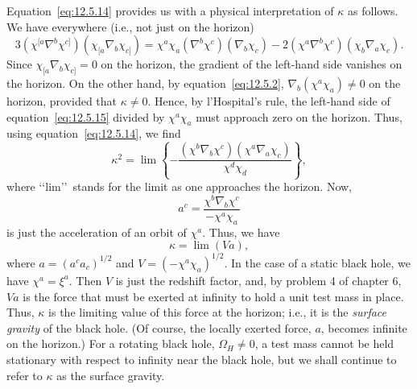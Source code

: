 Equation~\eqref{eq:12.5.14} provides us with a physical interpretation of
\(\kappa\) as follows. We have everywhere (i.e., not just on the horizon)
\begin{equation}
 3(\chi^{[a}\nabla^b\chi^{c]})(\chi_{[a}\nabla_b\chi_{c]})
 =\chi^a\chi_a(\nabla^b\chi^c)(\nabla_b\chi_c)
 -2(\chi^a\nabla^b\chi^c)(\chi_b\nabla_a\chi_c) .
 \tag{12.5.15}\label{eq:12.5.15}
\end{equation}
Since \(\chi_{[a}\nabla_b\chi_{c]}=0\) on the horizon, the gradient of the
left-hand side vanishes on the horizon. On the other hand, by
equation~\eqref{eq:12.5.2}, \(\nabla_b(\chi^a\chi_a)\ne0\) on the horizon, provided
that \(\kappa\ne0\). Hence, by l'Hospital's rule, the left-hand side of
equation~\eqref{eq:12.5.15} divided by \(\chi^a\chi_a\) must approach zero on the
horizon. Thus, using equation~\eqref{eq:12.5.14}, we find
\begin{equation}
 \kappa^2=\lim\left\{-\frac{(\chi^b\nabla_b\chi^c)(\chi^a\nabla_a\chi_c)}
 {\chi^d\chi_d}\right\} ,
 \tag{12.5.16}\label{eq:12.5.16}
\end{equation}
where \lq\lq lim\rq\rq\ stands for the limit as one approaches the horizon. Now,
\begin{equation}
 a^c=\frac{\chi^b\nabla_b\chi^c}{-\chi^a\chi_a}
 \tag{12.5.17}\label{eq:12.5.17}
\end{equation}
is just the acceleration of an orbit of \(\chi^a\). Thus, we have
\begin{equation}
 \kappa=\lim(Va) ,
 \tag{12.5.18}\label{eq:12.5.18}
\end{equation}
where \(a=(a^ca_c)^{1/2}\) and \(V=(-\chi^a\chi_a)^{1/2}\). In the case of a
static black hole, we have \(\chi^a=\xi^a\). Then \(V\) is just the redshift factor,
and, by problem 4 of chapter 6, \(Va\) is the force that must be exerted at infinity
to hold a unit test mass in place. Thus, \(\kappa\) is the limiting value of this
force at the horizon; i.e., it is the \emph{surface gravity} of the black hole. (Of
course, the locally exerted force, \(a\), becomes infinite on the horizon.) For a
rotating black hole, \(\Omega_H\ne0\), a test mass cannot be held stationary with
respect to infinity near the black hole, but we shall continue to refer to \(\kappa\) as
the surface gravity.


